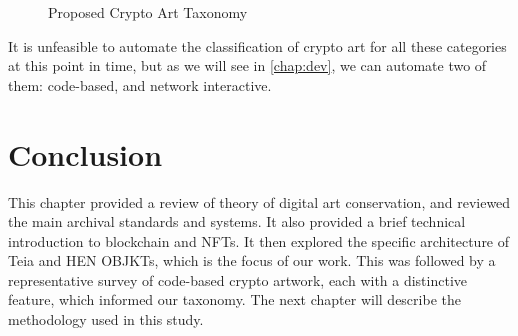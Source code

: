 \begin{figure}[h]
    \centering
    \captionsetup{justification=centering}
    
    \caption[Proposed Crypto Art Taxonomy]{Proposed Crypto Art Taxonomy}
    \label{fig:cryptoart-taxonomy}
\end{figure}

It is unfeasible to automate the classification of crypto art for all these categories at this point in time, but as we will see in \autoref{chap:dev}, we can automate two of them: code-based, and network interactive.

\section{Conclusion}

This chapter provided a review of theory of digital art conservation, and reviewed the main archival standards and systems. It also provided a brief technical introduction to blockchain and NFTs. It then explored the specific architecture of Teia and HEN OBJKTs, which is the focus of our work. This was followed by a representative survey of code-based crypto artwork, each with a distinctive feature, which informed our taxonomy. The next chapter will describe the methodology used in this study.

